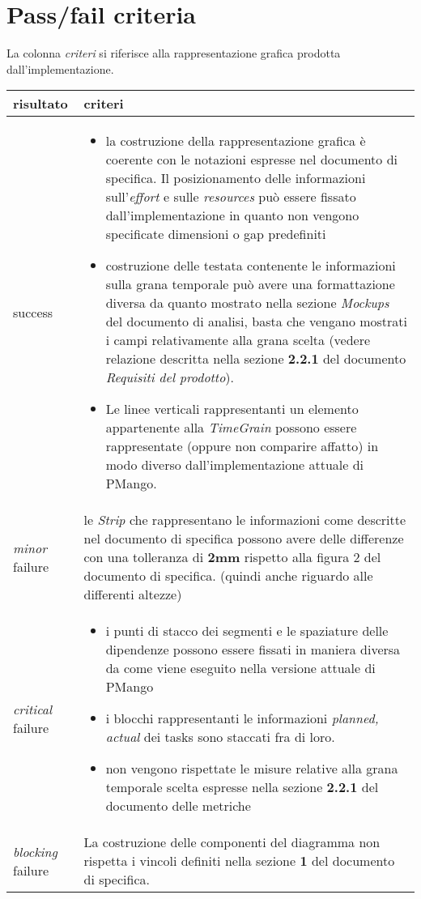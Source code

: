 \section*{Pass/fail criteria}
La colonna \emph{criteri} si riferisce alla rappresentazione grafica prodotta
dall'implementazione. 
\begin{table}[h!]
  \begin{center}
    \begin{tabular}{| l | p{100mm} |}
    \hline
    \textbf{risultato} & \textbf{criteri} \\
	\hline    
	success & 
    \begin{itemize}
  \item la costruzione della rappresentazione grafica \`e coerente con le
  notazioni espresse nel documento di specifica. Il posizionamento delle
  informazioni sull'\emph{effort} e sulle \emph{resources} pu\`o essere fissato
  dall'implementazione in quanto non vengono specificate dimensioni o gap
  predefiniti
  \item costruzione delle testata contenente le informazioni
    sulla grana temporale pu\`o avere una formattazione diversa da quanto
    mostrato nella sezione \emph{Mockups} del documento di analisi, basta che
    vengano mostrati i campi relativamente alla grana scelta (vedere relazione 
    descritta nella sezione \textbf{2.2.1} del documento  \emph{Requisiti del
    prodotto}).
\item Le linee verticali rappresentanti un elemento appartenente alla
\emph{TimeGrain} possono essere rappresentate (oppure non comparire affatto) in
modo diverso dall'implementazione attuale di PMango.      
\end{itemize}
\\
    \hline
    \emph{minor} failure & le \emph{Strip} che rappresentano le informazioni
    come descritte nel documento di specifica possono avere delle differenze
    con una tolleranza di \textbf{2mm} rispetto alla figura 2 del documento di
    specifica. (quindi anche riguardo alle differenti altezze)
    \\
    \hline
    \emph{critical} failure & 
    \begin{itemize}
     \item i punti di stacco dei segmenti e le spaziature
delle dipendenze possono essere fissati in maniera diversa da come viene
eseguito nella versione attuale di PMango
    \item i blocchi rappresentanti le informazioni \emph{planned, actual} dei
    tasks sono staccati fra di loro. 
    \item non vengono rispettate le misure relative alla grana temporale
    scelta espresse nella sezione \textbf{2.2.1} del documento delle metriche 
    \end{itemize}\\
    \hline
    \emph{blocking} failure & La costruzione delle componenti del diagramma
    non rispetta i vincoli definiti nella sezione \textbf{1} del documento di 
   specifica. \\
    \hline
    \end{tabular}
  \end{center}
	\label{table:passfailCriteriaGanttGeneration}
\end{table}